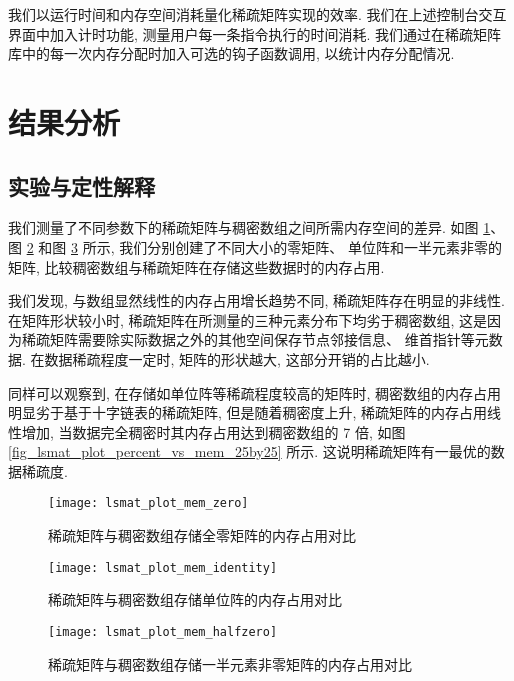 我们以运行时间和内存空间消耗量化稀疏矩阵实现的效率. 我们在上述控制台交互界面中加入计时功能, 测量用户每一条指令执行的时间消耗. 我们通过在稀疏矩阵库中的每一次内存分配时加入可选的钩子函数调用, 以统计内存分配情况.

\section{结果分析}

\subsection{实验与定性解释}

我们测量了不同参数下的稀疏矩阵与稠密数组之间所需内存空间的差异. 如图 \ref{fig_lsmat_plot_mem_zero}、 图 \ref{fig_lsmat_plot_mem_identity} 和图 \ref{fig_lsmat_plot_mem_halfzero} 所示, 我们分别创建了不同大小的零矩阵、 单位阵和一半元素非零的矩阵, 比较稠密数组与稀疏矩阵在存储这些数据时的内存占用.

我们发现, 与数组显然线性的内存占用增长趋势不同, 稀疏矩阵存在明显的非线性. 在矩阵形状较小时, 稀疏矩阵在所测量的三种元素分布下均劣于稠密数组, 这是因为稀疏矩阵需要除实际数据之外的其他空间保存节点邻接信息、 维首指针等元数据. 在数据稀疏程度一定时, 矩阵的形状越大, 这部分开销的占比越小.

同样可以观察到, 在存储如单位阵等稀疏程度较高的矩阵时, 稠密数组的内存占用明显劣于基于十字链表的稀疏矩阵, 但是随着稠密度上升, 稀疏矩阵的内存占用线性增加, 当数据完全稠密时其内存占用达到稠密数组的 7 倍, 如图 \ref{fig_lsmat_plot_percent_vs_mem_25by25} 所示. 这说明稀疏矩阵有一最优的数据稀疏度.

\begin{figure}
    \centering
    \texttt{[image: lsmat\_plot\_mem\_zero]}
    \caption{稀疏矩阵与稠密数组存储全零矩阵的内存占用对比}
    \label{fig_lsmat_plot_mem_zero}
\end{figure}

\begin{figure}
    \centering
    \texttt{[image: lsmat\_plot\_mem\_identity]}
    \caption{稀疏矩阵与稠密数组存储单位阵的内存占用对比}
    \label{fig_lsmat_plot_mem_identity}
\end{figure}

\begin{figure}
    \centering
    \texttt{[image: lsmat\_plot\_mem\_halfzero]}
    \caption{稀疏矩阵与稠密数组存储一半元素非零矩阵的内存占用对比}
    \label{fig_lsmat_plot_mem_halfzero}
\end{figure}

